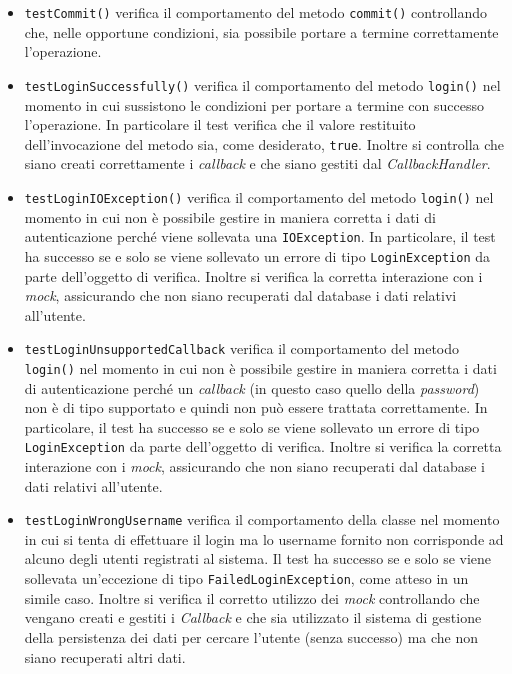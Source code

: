 \begin{itemize}
\begin{itemize}
\item \texttt{testCommit()} verifica il comportamento del metodo \texttt{commit()} controllando che, nelle opportune condizioni, sia possibile portare a termine correttamente l'operazione.

\item \texttt{testLoginSuccessfully()} verifica il comportamento del metodo \texttt{login()} nel momento in cui sussistono le condizioni per portare a termine con successo l'operazione. In particolare il test verifica che il valore restituito dell'invocazione del metodo sia, come desiderato, \texttt{true}. Inoltre si controlla che siano creati correttamente i \textit{callback} e che siano gestiti dal \textit{CallbackHandler}.

\item \texttt{testLoginIOException()} verifica il comportamento del metodo \texttt{login()} nel momento in cui non è possibile gestire in maniera corretta i dati di autenticazione perché viene sollevata una \texttt{IOException}. In particolare, il test ha successo se e solo se viene sollevato un errore di tipo \texttt{LoginException} da parte dell'oggetto di verifica. Inoltre si verifica la corretta interazione con i \textit{mock}, assicurando che non siano recuperati dal database i dati relativi all'utente.

\item \texttt{testLoginUnsupportedCallback} verifica il comportamento del metodo \texttt{login()} nel momento in cui non è possibile gestire in maniera corretta i dati di autenticazione perché un \textit{callback} (in questo caso quello della \textit{password}) non è di tipo supportato e quindi non può essere trattata correttamente. In particolare, il test ha successo se e solo se viene sollevato un errore di tipo \texttt{LoginException} da parte dell'oggetto di verifica. Inoltre si verifica la corretta interazione con i \textit{mock}, assicurando che non siano recuperati dal database i dati relativi all'utente.

\item \texttt{testLoginWrongUsername} verifica il comportamento della classe nel momento in cui si tenta di effettuare il login ma lo username fornito non corrisponde ad alcuno degli utenti registrati al sistema. Il test ha successo se e solo se viene sollevata un'eccezione di tipo \texttt{FailedLoginException}, come atteso in un simile caso. Inoltre si verifica il corretto utilizzo dei \textit{mock} controllando che vengano creati e gestiti i \textit{Callback} e che sia utilizzato il sistema di gestione della persistenza dei dati per cercare l'utente (senza successo) ma che non siano recuperati altri dati.


\end{itemize}
\end{itemize}
